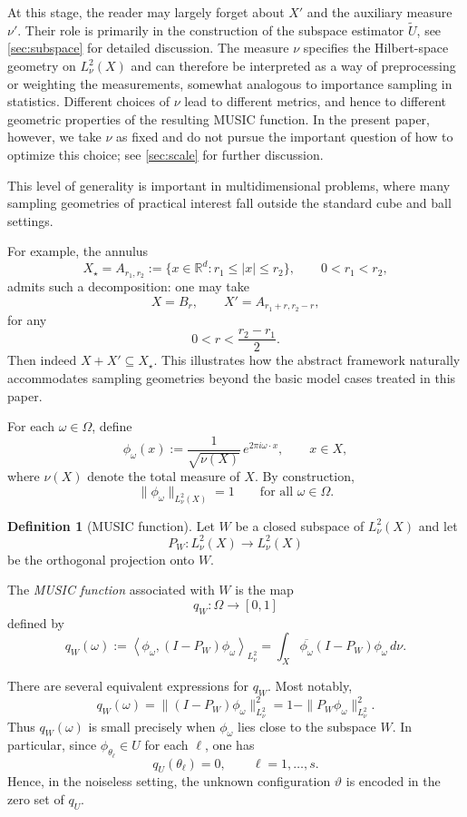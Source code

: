 \documentclass[11pt]{article}
\theoremstyle{definition}
\newtheorem{definition}{Definition}[section]
\numberwithin{theorem}{section}
\numberwithin{lemma}{section}
\numberwithin{equation}{section}
\def\R{\mathbb{R}}
\renewcommand{\subset}{\subseteq}
\renewcommand{\tilde}{\widetilde}
\newcommand{\domain}{\Omega}
\newcommand{\sampset}{X}
\newcommand{\inner}[1]{{\left\langle#1\right\rangle}}
\numberwithin{equation}{section}
\begin{document}
At this stage, the reader may largely forget about $\sampset'$ and the auxiliary measure $\nu'$. Their role is primarily in the construction of the subspace estimator $\tilde U$, see \cref{sec:subspace} for detailed discussion. The measure $\nu$ specifies the Hilbert-space geometry on $L^2_\nu(X)$ and can therefore be interpreted as a way of preprocessing or weighting the measurements, somewhat analogous to importance sampling in statistics. Different choices of $\nu$ lead to different metrics, and hence to different geometric properties of the resulting MUSIC function. In the present paper, however, we take $\nu$ as fixed and do not pursue the important question of how to optimize this choice; see \cref{sec:scale} for further discussion.





This level of generality is important in multidimensional problems, where many sampling geometries of practical interest fall outside the standard cube and ball settings.

For example, the annulus
\[
\sampset_\star=A_{r_1,r_2}:=\{x\in\R^d:r_1\le |x|\le r_2\},
\qquad 0<r_1<r_2,
\]
admits such a decomposition: one may take
\[
X=B_r,
\qquad
X'=A_{r_1+r,r_2-r},
\]
for any
\[
0<r<\frac{r_2-r_1}{2}.
\]
Then indeed $X+X'\subset \sampset_\star$. This illustrates how the abstract framework naturally accommodates sampling geometries beyond the basic model cases treated in this paper.

For each $\omega\in\domain$, define
\begin{equation}
\label{eq:phiomega}
\phi_\omega(x):=\frac{1}{\sqrt{\nu(X)}}\,e^{2\pi i \omega\cdot x},
\qquad x\in X,
\end{equation}
where $\nu(X)$ denote the total measure of $X$.
By construction,
\[
\|\phi_\omega\|_{L^2_\nu(X)}=1
\qquad \text{for all } \omega\in\domain.
\]

\begin{definition}[MUSIC function]
\label{def:musicfunction}
Let $W$ be a closed subspace of $L^2_\nu(X)$ and let
\[
P_W\colon L^2_\nu(X)\to L^2_\nu(X)
\]
be the orthogonal projection onto $W$.

The \emph{MUSIC function} associated with $W$ is the map
\[
q_W\colon \domain\to [0,1]
\]
defined by
\[
q_W(\omega)
:=
\inner{\phi_\omega,(I-P_W)\phi_\omega}_{L^2_\nu}
=
\int_X \overline{\phi_\omega}(I-P_W)\phi_\omega\,d\nu.
\]
\end{definition}

There are several equivalent expressions for $q_W$. Most notably,
\begin{equation}
\label{eq:qformulas}
q_W(\omega)
=
\|(I-P_W)\phi_\omega\|_{L^2_\nu}^2
=
1-\|P_W\phi_\omega\|_{L^2_\nu}^2.
\end{equation}
Thus $q_W(\omega)$ is small precisely when $\phi_\omega$ lies close to the subspace $W$. In particular, since $\phi_{\theta_\ell}\in U$ for each $\ell$, one has
\[
q_U(\theta_\ell)=0,
\qquad \ell=1,\dots,s.
\]
Hence, in the noiseless setting, the unknown configuration $\vartheta$ is encoded in the zero set of $q_U$.
\end{document}
